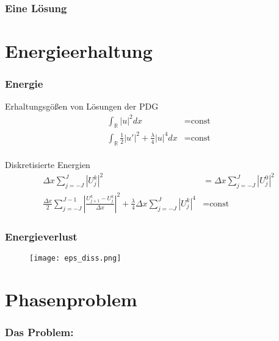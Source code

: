 \documentclass{beamer}
\begin{document}
\begin{frame}
    \frametitle{Eine Lösung}


\end{frame}

\section{Energieerhaltung}

\begin{frame}
    \frametitle{Energie}

    Erhaltungsgößen von Lösungen der PDG
    \begin{align*}
        \int_\mathbb{R} |u|^2 dx &= \text{const}\\
        \int_\mathbb{R} \frac{1}{2}|u'|^2 + \frac{\lambda}{4}|u|^4 dx &= \text{const}
    \end{align*}
    \ \\
    Diskretisierte Energien
    \begin{align*}
        \Delta x \sum_{j=-J}^J |U_j^k|^2 &= \Delta x \sum_{j=-J}^J |U_j^0|^2\\
        \frac{\Delta x}{2} \sum_{j=-J}^{J-1} |\frac{U_{j+1}^k-U_j^k}{\Delta x}|^2+\frac{\lambda}{4}\Delta x \sum_{j=-J}^J |U_j^k|^4 &= \text{const}
    \end{align*}

\end{frame}

\begin{frame}
    \frametitle{Energieverlust}

    \begin{figure}
        \begin{center}
            \texttt{[image: eps\_diss.png]}
        \end{center}
    \end{figure}

\end{frame}


\section{Phasenproblem}

\begin{frame}
    \frametitle{Das Problem:}


\end{frame}
\end{document}
